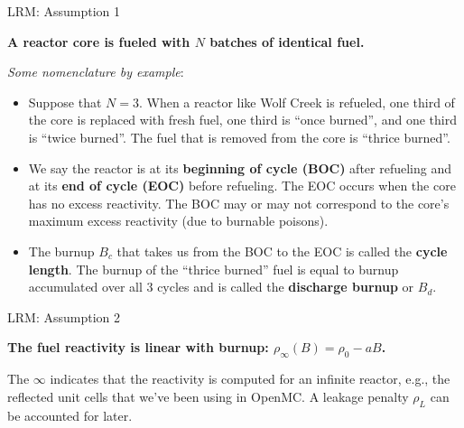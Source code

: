 \documentclass[aspectratio=1610]{beamer}
\begin{document}
\begin{frame}[fragile]{LRM: Assumption 1}

\begin{center}
{\bf {\large \textcolor{wcprimary}{A reactor core is fueled with $N$ batches of identical fuel.}}}
\end{center} 

\vfill 

{\it Some nomenclature by example}:
\vfill

\begin{itemize}
\item Suppose that $N = 3$. When a reactor like Wolf Creek is refueled, one third of the core is replaced with fresh fuel, one third is ``once burned'', and one third is ``twice burned''.  The fuel that is removed from the core is ``thrice burned''.  
\item We say the reactor is at its {\bf beginning of cycle (BOC)} after refueling and at its  {\bf end of cycle (EOC)} before refueling.  The EOC occurs when the core has no excess reactivity.  The BOC may or may not correspond to the core's maximum excess reactivity (due to burnable poisons).
\item The burnup $B_c$ that takes us from the BOC to the EOC is called the  {\bf cycle length}.  The burnup of the ``thrice burned'' fuel is equal to burnup accumulated over all 3 cycles and is called the  {\bf discharge burnup} or $B_d$.
\end{itemize}

\end{frame}

\begin{frame}[fragile]{LRM: Assumption 2}

\begin{center}
{\bf {\large \textcolor{wcprimary}{
The fuel reactivity is linear with burnup: 
 $\boxed{\rho_{\infty}(B) = \rho_0 - aB}$.
}}}
\end{center} 

\vfill 

The $\infty$ indicates that the reactivity is computed for an infinite reactor, e.g., the reflected unit cells that we've been using in OpenMC.  A leakage penalty $\rho_L$ can be accounted for later.

\end{frame}
\end{document}

